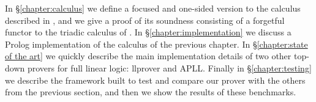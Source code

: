 In \S\ref{chapter:calculus} we define a focused and one-sided version to the calculus described in \cite{HarlandPym}, and we give a proof of its soundness consisting of a forgetful functor to the triadic calculus of \cite{Focusing}.
In \S\ref{chapter:implementation} we discuss a Prolog implementation of the calculus of the previous chapter.
In \S\ref{chapter:state of the art} we quickly describe the main implementation details of two other top-down provers for full linear logic: llprover and APLL.
Finally in \S\ref{chapter:testing} we describe the framework built to test and compare our prover with the others from the previous section, and then we show the results of these benchmarks.
